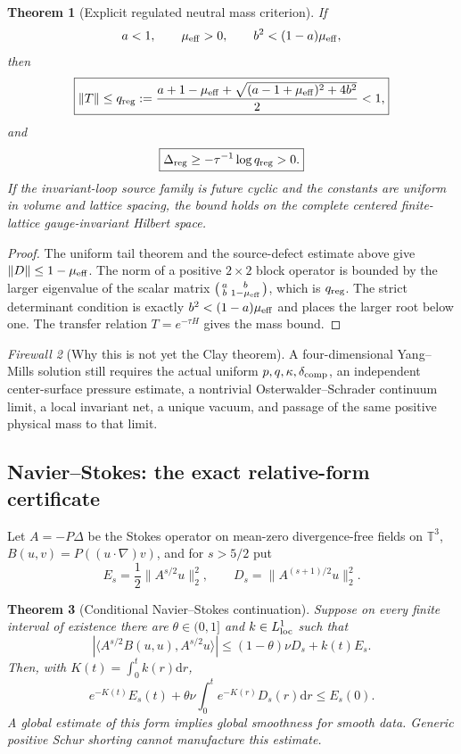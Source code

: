 \documentclass[11pt]{article}
\newtheorem{theorem}{Theorem}[section]
\theoremstyle{definition}
\theoremstyle{remark}
\newtheorem{firewall}[theorem]{Firewall}
\newcommand{\norm}[1]{\lVert#1\rVert}
\newcommand{\dd}{\mathrm d}
\newcommand{\Torus}{\mathbb T}
\begin{document}
\begin{theorem}[Explicit regulated neutral mass criterion]
\label{thm:YM-regulated-master}
If
\[
 a<1,\qquad \mu_{\rm eff}>0,
 \qquad b^2<(1-a)\mu_{\rm eff},
\]
then
\[
 \boxed{
 \norm T\le q_{\rm reg}
 :=\frac{a+1-\mu_{\rm eff}
 +\sqrt{(a-1+\mu_{\rm eff})^2+4b^2}}2<1,}
\]
and
\[
 \boxed{\Delta_{\rm reg}\ge-\tau^{-1}\log q_{\rm reg}>0.}
\]
If the invariant-loop source family is future cyclic and the constants are
uniform in volume and lattice spacing, the bound holds on the complete
centered finite-lattice gauge-invariant Hilbert space.
\end{theorem}

\begin{proof}
The uniform tail theorem and the source-defect estimate above give
$\norm D\le1-\mu_{\rm eff}$.  The norm of a positive $2\times2$ block
operator is bounded by the larger eigenvalue of the scalar matrix
$\begin{psmallmatrix}a&b\\b&1-\mu_{\rm eff}\end{psmallmatrix}$, which is
$q_{\rm reg}$.  The strict determinant condition is exactly
$b^2<(1-a)\mu_{\rm eff}$ and places the larger root below one.  The transfer
relation $T=e^{-\tau H}$ gives the mass bound.
\end{proof}

\begin{firewall}[Why this is not yet the Clay theorem]
A four-dimensional Yang--Mills solution still requires the actual uniform
$p,q,\kappa,\delta_{\rm comp}$, an independent center-surface pressure
estimate, a nontrivial Osterwalder--Schrader continuum limit, a local
invariant net, a unique vacuum, and passage of the same positive physical
mass to that limit.
\end{firewall}

\subsection{Navier--Stokes: the exact relative-form certificate}

Let $A=-P\Delta$ be the Stokes operator on mean-zero divergence-free fields
on $\Torus^3$, $B(u,v)=P((u\cdot\nabla)v)$, and for $s>5/2$ put
\[
 E_s=\frac12\norm{A^{s/2}u}_2^2,
 \qquad D_s=\norm{A^{(s+1)/2}u}_2^2.
\]

\begin{theorem}[Conditional Navier--Stokes continuation]
\label{thm:NS-relative-master}
Suppose on every finite interval of existence there are $\theta\in(0,1]$ and
$k\in L^1_{\rm loc}$ such that
\[
 \left|\langle A^{s/2}B(u,u),A^{s/2}u\rangle\right|
 \le(1-\theta)\nu D_s+k(t)E_s.
\]
Then, with $K(t)=\int_0^tk(r)\dd r$,
\[
 \boxed{
 e^{-K(t)}E_s(t)
 +\theta\nu\int_0^te^{-K(r)}D_s(r)\dd r
 \le E_s(0).}
\]
A global estimate of this form implies global smoothness for smooth data.
Generic positive Schur shorting cannot manufacture this estimate.
\end{theorem}
\end{document}
